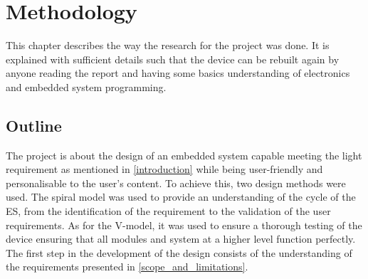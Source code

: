\chapter{Methodology}

This chapter describes the way the research for the project was done. It is explained with sufficient details such that the device can be rebuilt again by anyone reading the report and having some basics understanding of electronics and embedded system programming.

\section{Outline}
The project is about the design of an embedded system capable meeting the light requirement as mentioned in \cref{introduction} while being user-friendly and personalisable to the user's content. To achieve this, two design methods were used. The spiral model was used to provide an understanding of the cycle of the ES, from the identification of the requirement to the validation of the user requirements. As for the  V-model, it was used to ensure a thorough testing of the device ensuring that all modules and system at a higher level function perfectly. \\
The first step in the development of the design consists of the understanding of the requirements presented in \cref{scope_and_limitations}.
